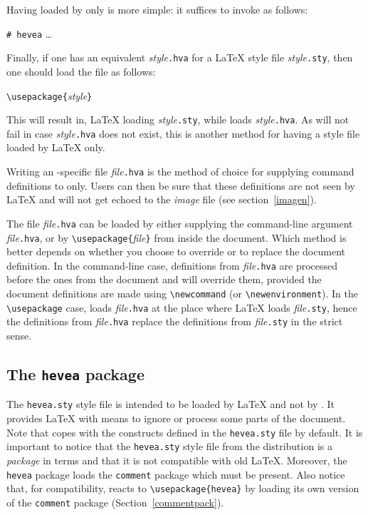 \label{heveaonly}Having  loaded by \hevea{} only is more
simple: it  suffices to invoke \hevea{} as follows:
\begin{flushleft}
\verb+# hevea+ \ldots
\end{flushleft}


Finally, if one has an \hevea{} equivalent \textit{style}\texttt{.hva}
for a \LaTeX{} style file \textit{style}\texttt{.sty},
then one should load the file as follows:
\begin{flushleft}
\verb+\usepackage{+\textit{style}\verb+}+
\end{flushleft}
This will result in, \LaTeX{} loading \textit{style}\texttt{.sty},
while \hevea{} loads \textit{style}\texttt{.hva}.
As \hevea{} will not fail in case \textit{style}\texttt{.hva} does not
exist, this is another method for having a style file loaded by
\LaTeX{} only.

Writing an \hevea{}-specific file \textit{file}\texttt{.hva}
is the method of choice for supplying command definitions
to \hevea{} only. Users can then be sure that these definitions are
not seen by \LaTeX{} and will not get echoed to the \textit{image}
file (see section~\ref{imagen}).

The file \textit{file}\texttt{.hva} can be loaded by either
supplying the command-line argument
\textit{file}\texttt{.hva}, or by
\verb+\usepackage{+\textit{file}\verb+}+ from inside the document.
Which method is better depends
on whether you choose to override or to replace the document
definition.
In the command-line case,
definitions from \textit{file}\texttt{.hva} are processed before the
ones from the document and will override them, provided
the document definitions are made using \verb+\newcommand+ (or
\verb+\newenvironment+).
In the \verb+\usepackage+ case, \hevea{} loads \textit{file}\texttt{.hva}
at the place where \LaTeX{} loads \textit{file}\texttt{.sty}, hence
the definitions from \textit{file}\texttt{.hva} replace
the definitions from \textit{file}\texttt{.sty} in the strict sense.


\subsection{The \label{heveastyle}\protect\texttt{hevea} package}
The \texttt{hevea.sty} style file is intended to be loaded by \LaTeX{}
and not by \hevea{}.
It provides \LaTeX{} with means to ignore or process some parts of the
document.
Note that \hevea{} copes with the constructs defined in
the \texttt{hevea.sty} file by default.
It is important to notice that the \texttt{hevea.sty} style file from
the distribution is a \emph{package} in \LaTeXe{} terms and that it
is not compatible with old \LaTeX{}. Moreover, the \texttt{hevea}
package loads the \texttt{comment} package which must be present.
Also notice that, for compatibility,
\hevea{} reacts to
\verb+\usepackage{hevea}+ by loading its own version
of the \texttt{comment} package (Section~\ref{commentpack}).


